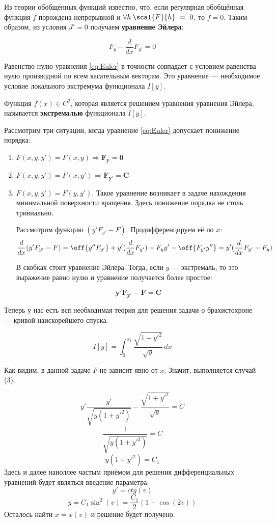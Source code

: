 	Из теории обобщённых функций известно, что, если регулярная обобщённая функция $f$ порождена непрерывной
	и $\forall h\:\scal{F}{h}~=~0$, то $f = 0$. Таким образом, из условия $J' = 0$ получаем \textbf{уравнение Эйлера}:
	
	\begin{equation} \label{eq:Euler}
		F_y - \frac{d}{dx}F_{y'} = 0 
	\end{equation}
	
	Равенство нулю уравнения \ref{eq:Euler} в точности совпадает с условием равенства нулю производной по всем 
	касательным векторам. Это уравнение --- необходимое условие локального экстремума функционала $I[y]$.
	
	\begin{defi}
		Функция $f(x) \in C^2$, которая является решением уравнения уравнения Эйлера, называется \textbf{экстремалью} 
		функционала $I[y]$.
	\end{defi}
	
	Рассмотрим три ситуации, когда уравнение \ref{eq:Euler} допускает понижение порядка:
	\begin{enumerate}
		\item $F(x,y,y') = F(x,y)  \Rightarrow \mathbf{F_y = 0}$
		\item $F(x,y,y') = F(x,y') \Rightarrow \mathbf{F_{y'} = C}$
		\item $F(x,y,y') = F(y,y')$. Такое уравнение возникает в задаче нахождения минимальной поверхности вращения.
		Здесь понижение порядка не столь тривиально.
		
		Рассмотрим функцию $(y'F_{y'} - F)$. Продифференцируем её по $x$:
		$$\frac{d}{dx}(y'F_{y'} - F) =
		  \off{y''F_{y'}} + y'(\frac{d}{dx}F_{y'}) - F_yy' - \off{F_{y'}y''} = 
		  y'(\frac{d}{dx}F_{y'} - F_y)$$
		
		В скобках стоит уравнение Эйлера. Тогда, если $y$ --- экстремаль, то это выражение равно нулю и уравнение 
		получается более простое:
		
		$$\mathbf{y'F_{y'} - F = C}$$
	\end{enumerate}
	
	Теперь у нас есть вся необходимая теория для решения задачи о брахистохроне --- кривой наискорейшего спуска.
	
	$$I[y] = \int_0^{x_1} \frac{\sqrt{1+y'^2}}{\sqrt{y}} \,dx$$
	
	Как видим, в данной задаче $F$ не зависит явно от $x$. Значит, выполняется случай (3).
	
	$$y'\frac{y'}{\sqrt{y(1+y'^2)}} - \frac{\sqrt{1+y'^2}}{\sqrt{y}} = C$$
	$$\frac{1}{\sqrt{y(1+y'^2)}} = C$$
	$$y(1+y'^2) = C_1$$
	Здесь и далее наиоллее частым приёмом для решения дифференциальных уравнений будет являться введение параметра.
	$$y' = ctg(v)$$
	$$y = C_1 \sin^2(v) = \frac{C_1}{2}(1 - \cos(2v))$$
	Осталось найти $x = x(v)$ и решение будет получено.
	
